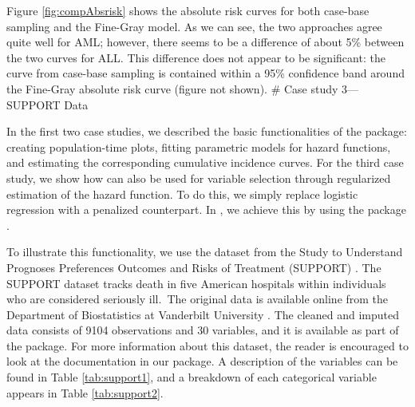 \documentclass[
]{jss}
\begin{document}
Figure \ref{fig:compAbsrisk} shows the absolute risk curves for both
case-base sampling and the Fine-Gray model. As we can see, the two
approaches agree quite well for AML; however, there seems to be a
difference of about 5\% between the two curves for ALL. This difference
does not appear to be significant: the curve from case-base sampling is
contained within a 95\% confidence band around the Fine-Gray absolute
risk curve (figure not shown). \# Case study 3---SUPPORT Data

In the first two case studies, we described the basic functionalities of
the  package: creating population-time plots, fitting
parametric models for hazard functions, and estimating the corresponding
cumulative incidence curves. For the third case study, we show how
 can also be used for variable selection through
regularized estimation of the hazard function. To do this, we simply
replace logistic regression with a penalized counterpart. In
, we achieve this by using the  package
\citep{friedman2010jss}.

To illustrate this functionality, we use the dataset from the Study to
Understand Prognoses Preferences Outcomes and Risks of Treatment
(SUPPORT) \citep{knaus1995support}. The SUPPORT dataset tracks death in
five American hospitals within individuals who are considered seriously
ill.~The original data is available online from the Department of
Biostatistics at Vanderbilt University \citep{harrell_2020}. The cleaned
and imputed data consists of 9104 observations and 30 variables, and it
is available as part of the  package. For more information
about this dataset, the reader is encouraged to look at the
documentation in our package. A description of the variables can be
found in Table \ref{tab:support1}, and a breakdown of each categorical
variable appears in Table \ref{tab:support2}.
\end{document}
